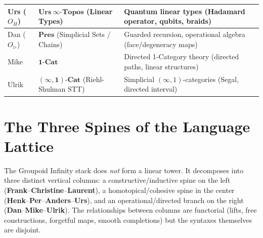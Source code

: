 \documentclass{article}
\theoremstyle{definition}
\theoremstyle{plain}
\begin{document}
\begin{table}[ht!]
{\begin{tabular}{lll}
Urs ($O_H$) & $\mathbf{Urs}\ \infty\text{-}\mathbf{Topos}$ (Linear Types) & Quantum linear types (Hadamard operator, qubits, braids) \\
\hline
Dan ($O_{\triangleright}$) & $\mathbf{Pres}$ (Simplicial Sets / Chains) & Guarded recursion, operational algebra (face/degeneracy maps) \\
Mike & $\mathbf{1\text{-}Cat}$ & Directed 1-Category theory (directed paths, linear structures) \\
Ulrik & $\mathbf{(\infty, 1)\text{-}Cat}$ (Riehl-Shulman STT) & Simplicial $(\infty, 1)$-categories (Segal, directed interval) \\
\hline
\end{tabular}%
}
\end{table}

\newpage
\section{The Three Spines of the Language Lattice}
The Groupoid Infinity stack does \emph{not} form a linear tower. It decomposes
into three distinct vertical columns: a constructive/inductive spine on the left
(\textbf{Frank}--\textbf{Christine}--\textbf{Laurent}), a homotopical/cohesive spine in the center
(\textbf{Henk}--\textbf{Per}--\textbf{Anders}--\textbf{Urs}), and an operational/directed branch
on the right (\textbf{Dan}--\textbf{Mike}--\textbf{Ulrik}). The relationships between columns
are functorial (lifts, free constructions, forgetful maps, smooth completions) but the syntaxes
themselves are disjoint.

\begin{center}
\end{center}
\end{document}
